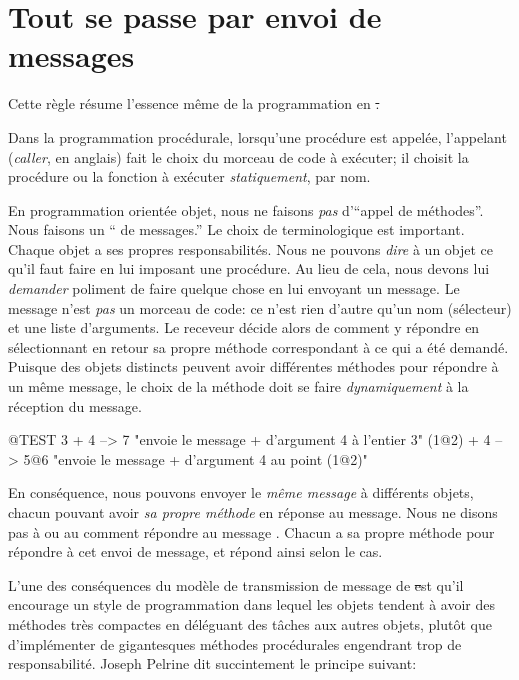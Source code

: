 \documentclass[a4paper,10pt,twoside]{book}
\begin{document}
\section{Tout se passe par envoi de messages}


Cette r\`egle r\'esume l'essence m\^eme de la programmation en \st.

Dans la programmation proc\'edurale, lorsqu'une proc\'edure est appel\'ee, l'appelant (\emph{caller}, en anglais) fait le choix du morceau de code \`a ex\'ecuter; il choisit la proc\'edure ou la fonction \`a ex\'ecuter \emph{statiquement}, par nom.  

En programmation orient\'ee objet, nous ne faisons \emph{pas} d'``appel de m\'ethodes''. Nous faisons un `` de messages.''
Le choix de terminologique est important.
Chaque objet a ses propres responsabilit\'es.
Nous ne pouvons \emph{dire} \`a un objet ce qu'il faut faire en lui imposant 
une proc\'edure.
Au lieu de cela, nous devons lui \emph{demander} poliment de faire quelque chose en lui envoyant un message.
Le message n'est \emph{pas} un morceau de code: ce n'est rien d'autre qu'un nom (s\'electeur) et une liste d'arguments.
Le receveur d\'ecide alors de comment y r\'epondre en s\'electionnant en retour
sa propre m\'ethode correspondant \`a ce qui a \'et\'e demand\'e.
Puisque des objets distincts peuvent avoir diff\'erentes m\'ethodes pour r\'epondre \`a un m\^eme message, le choix de la m\'ethode doit se faire \emph{dynamiquement} \`a la r\'eception du message.
\begin{code}{@TEST}
3 + 4         --> 7          "envoie le message + d'argument 4 \`a l'entier  3"
(1@2) + 4 --> 5@6    "envoie le message + d'argument 4 au point (1@2)"
\end{code}
\noindent
En cons\'equence, nous pouvons envoyer le \emph{m\^eme message} \`a diff\'erents objets, chacun pouvant avoir \emph{sa propre m\'ethode} en r\'eponse au message.
Nous ne disons pas \`a   ou au   comment r\'epondre au message .
Chacun a sa propre m\'ethode pour r\'epondre \`a cet envoi de message, et r\'epond ainsi selon le cas.

L'une des cons\'equences du mod\`ele de transmission de message de \st est qu'il encourage un style de programmation dans lequel les objets tendent \`a avoir des m\'ethodes tr\`es compactes en d\'el\'eguant des t\^aches aux autres objets, plut\^ot que d'impl\'ementer de gigantesques m\'ethodes proc\'edurales engendrant trop de responsabilit\'e.
Joseph Pelrine
dit succintement le principe suivant:
\end{document}
